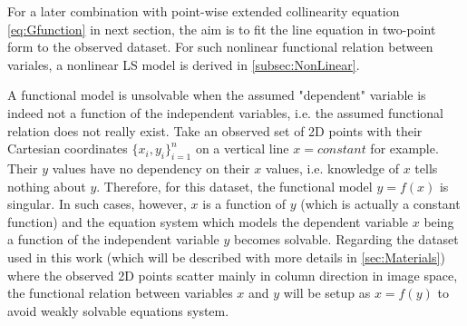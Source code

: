 For a later combination with point-wise extended collinearity equation \eqref{eq:Gfunction} in next section, the aim is to fit the line equation in two-point form to the observed dataset. 
For such nonlinear functional relation between variales, a nonlinear LS model is derived in \cref{subsec:NonLinear}.

A functional model is unsolvable when the assumed "dependent" variable is indeed not a function of the independent variables, i.e. the assumed functional relation does not really exist. Take an observed set of 2D points with their Cartesian coordinates $\{x_i,y_i\}^n_{i=1}$ on a vertical line $x=constant$ for example. Their $y$ values have no dependency on their $x$ values, i.e. knowledge of $x$ tells nothing about $y$. Therefore, for this dataset, the functional model $y=f(x)$ is singular. In such cases, however, $x$ is a function of $y$ (which is actually a constant function) and the equation system which models the dependent variable $x$ being a function of the independent variable $y$ becomes solvable. Regarding the dataset used in this work (which will be described with more details in \cref{sec:Materials}) where the observed 2D points scatter mainly in column direction in image space, the functional relation between variables $x$ and $y$ will be setup as $x=f(y)$ to avoid weakly solvable equations system.





